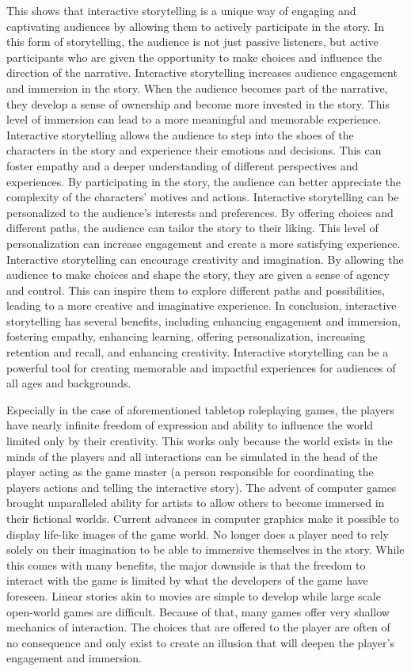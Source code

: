 %
This shows that interactive storytelling is a unique way of engaging and captivating audiences by allowing them to actively participate in the story.
In this form of storytelling, the audience is not just passive listeners, but active participants who are given the opportunity to make choices and influence the direction of the narrative.
Interactive storytelling increases audience engagement and immersion in the story. When the audience becomes part of the narrative, they develop a sense of ownership and become more invested in the story.
This level of immersion can lead to a more meaningful and memorable experience.
Interactive storytelling allows the audience to step into the shoes of the characters in the story and experience their emotions and decisions.
This can foster empathy and a deeper understanding of different perspectives and experiences.
By participating in the story, the audience can better appreciate the complexity of the characters' motives and actions.
Interactive storytelling can be personalized to the audience's interests and preferences.
By offering choices and different paths, the audience can tailor the story to their liking.
This level of personalization can increase engagement and create a more satisfying experience.
Interactive storytelling can encourage creativity and imagination.
By allowing the audience to make choices and shape the story, they are given a sense of agency and control.
This can inspire them to explore different paths and possibilities, leading to a more creative and imaginative experience.
In conclusion, interactive storytelling has several benefits, including enhancing engagement and immersion, fostering empathy, enhancing learning, offering personalization, increasing retention and recall, and enhancing creativity.
Interactive storytelling can be a powerful tool for creating memorable and impactful experiences for audiences of all ages and backgrounds.
%

Especially in the case of aforementioned tabletop roleplaying games, the players have nearly infinite freedom of expression and ability to influence the world limited only by their creativity.
This works only because the world exists in the minds of the players and all interactions can be simulated in the head of the player acting as the game master (a person responsible for coordinating the players actions and telling the interactive story).
The advent of computer games brought unparalleled ability for artists to allow others to become immersed in their fictional worlds.
Current advances in computer graphics make it possible to display life-like images of the game world.
No longer does a player need to rely solely on their imagination to be able to immersive themselves in the story.
While this comes with many benefits, the major downside is that the freedom to interact with the game is limited by what the developers of the game have foreseen.
Linear stories akin to movies are simple to develop while large scale open-world games are difficult.
Because of that, many games offer very shallow mechanics of interaction.
The choices that are offered to the player are often of no consequence and only exist to create an illusion that will deepen the player's engagement and immersion.

